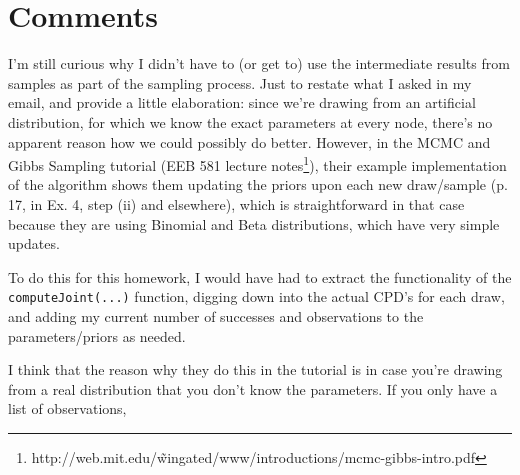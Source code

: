 \documentclass[11pt]{report}
\begin{document}
\section{Comments}

I'm still curious why I didn't have to (or get to) use the intermediate results from samples as part of the sampling process. Just to restate what I asked in my email, and provide a little elaboration: since we're drawing from an artificial distribution, for which we know the exact parameters at every node, there's no apparent reason how we could possibly do better. However, in the MCMC and Gibbs Sampling tutorial (EEB 581 lecture notes\footnote{http://web.mit.edu/\~wingated/www/introductions/mcmc-gibbs-intro.pdf}), their example implementation of the algorithm shows them updating the priors upon each new draw/sample (p. 17, in Ex. 4, step (ii) and elsewhere), which is straightforward in that case because they are using Binomial and Beta distributions, which have very simple updates.

To do this for this homework, I would have had to extract the functionality of the \texttt{computeJoint(...)} function, digging down into the actual CPD's for each draw, and adding my current number of successes and observations to the parameters/priors as needed.

I think that the reason why they do this in the tutorial is in case you're drawing from a real distribution that you don't know the parameters. If you only have a list of observations, 
\end{document}
